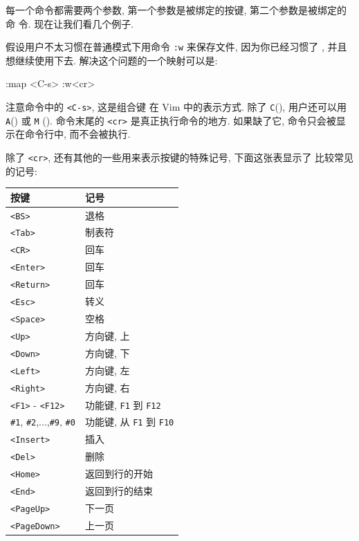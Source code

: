 每一个命令都需要两个参数, 第一个参数是被绑定的按键, 第二个参数是被绑定的命
令. 现在让我们看几个例子.

假设用户不太习惯在普通模式下用命令 \texttt{:w} 来保存文件, 因为你已经习惯了
, 并且想继续使用下去.
解决这个问题的一个映射可以是:
\begin{vimcmd}
:map <C-s> :w<cr>
\end{vimcmd}

注意命令中的 \texttt{<C-s>}, 这是组合键  在 Vim 中的表示方式.
除了 \texttt{C}(), 用户还可以用 \texttt{A}() 或
\texttt{M} (). 命令末尾的 \texttt{<cr>} 是真正执行命令的地方.
如果缺了它, 命令只会被显示在命令行中, 而不会被执行.

除了 \texttt{<cr>}, 还有其他的一些用来表示按键的特殊记号, 下面这张表显示了
比较常见的记号:
\begin{center}
    \begin{tabular}{ll}
        \hline
        按键        & 记号  \\
        \hline
        \texttt{<BS>}   & 退格 \\
        \texttt{<Tab>}   &  制表符 \\
        \texttt{<CR>}   & 回车  \\
        \texttt{<Enter>}   & 回车 \\
        \texttt{<Return>}   & 回车 \\
        \texttt{<Esc>}   & 转义 \\
        \texttt{<Space>}   & 空格 \\
        \texttt{<Up>}   & 方向键, 上 \\
        \texttt{<Down>}   & 方向键, 下 \\
        \texttt{<Left>}   & 方向键, 左 \\
        \texttt{<Right>}   & 方向键, 右 \\
        \texttt{<F1>} - \texttt{<F12>}  & 功能键, \texttt{F1} 到
            \texttt{F12} \\
        \texttt{\#1}, \texttt{\#2},...,\texttt{\#9}, \texttt{\#0}  & 功能键, 从
            \texttt{F1} 到 \texttt{F10} \\
        \texttt{<Insert>}   & 插入 \\
        \texttt{<Del>}   & 删除 \\
        \texttt{<Home>}   & 返回到行的开始 \\
        \texttt{<End>}   & 返回到行的结束 \\
        \texttt{<PageUp>}   & 下一页 \\
        \texttt{<PageDown>}   & 上一页 \\
        \hline
    \end{tabular}
\end{center}

